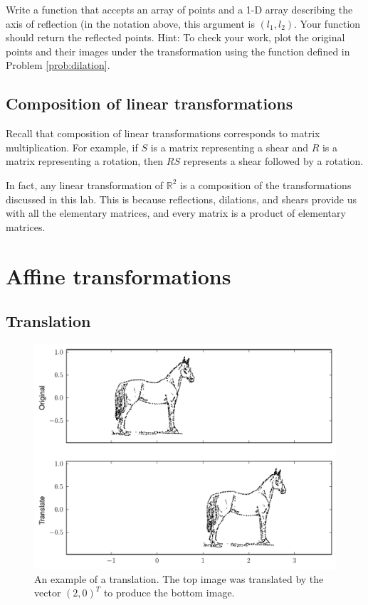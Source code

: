 \begin{problem}[Optional]
Write a function that accepts an array of points and a 1-D array describing the axis of reflection (in the notation above, this argument is $(l_1, l_2)$. Your function should return the reflected points. Hint: To check your work, plot the original points and their images under the transformation using the function  defined in Problem \ref{prob:dilation}.
\end{problem}

\subsection*{Composition of linear transformations}
Recall that composition of linear transformations corresponds to matrix multiplication. For example, if $S$ is a matrix representing a shear and $R$ is a matrix representing a rotation, then $RS$ represents a shear followed by a rotation.

In fact, any linear transformation of $\mathbb{R}^2$ is a composition of the transformations discussed in this lab. This is because reflections, dilations, and shears provide us with all the elementary matrices, and every matrix is a product of elementary matrices. 

\section*{Affine transformations}
\subsection*{Translation}

\begin{figure}
\includegraphics[width=\textwidth]{translate.pdf}
\caption{
An example of a translation.
The top image was translated by the vector $(2, 0)^T$ to produce the bottom image.}
\label{fig:translation}
\end{figure}

